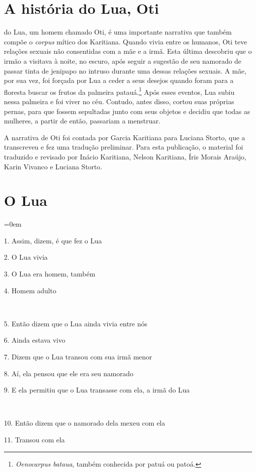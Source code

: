 \chapter{A história do Lua, Oti}

 do Lua, um homem chamado Oti, é uma importante narrativa que
também compõe o \emph{corpus} mítico dos Karitiana. Quando vivia entre
os humanos, Oti teve relações sexuais não consentidas com a mãe e a
irmã. Esta última descobriu que o irmão a visitava à noite, no escuro,
após seguir a sugestão de seu namorado de passar tinta de jenipapo no
intruso durante uma dessas relações sexuais. A mãe, por sua vez, foi
forçada por Lua a ceder a seus desejos quando foram para a floresta
buscar os frutos da palmeira patauá.\footnote{\emph{Oenocarpus bataua},
  também conhecida por patuá ou patoá.} Após esses eventos, Lua subiu
nessa palmeira e foi viver no céu. Contudo, antes disso, cortou suas
próprias pernas, para que fossem sepultadas junto com seus objetos e
decidiu que todas as mulheres, a partir de então, passariam a menstruar.

A narrativa de Oti foi contada por Garcia Karitiana para Luciana Storto,
que a transcreveu e fez uma tradução preliminar. Para esta publicação, o
material foi traduzido e revisado por Inácio Karitiana, Nelson
Karitiana, Íris Morais Araújo, Karin Vivanco e Luciana Storto.


\chapter*{O Lua}
\begingroup\parindent=0em

1. Assim, dizem, é que fez o Lua

2. O Lua vivia

3. O Lua era homem, também

4. Homem adulto

~

5. Então dizem que o Lua ainda vivia entre nós

6. Ainda estava vivo

7. Dizem que o Lua transou com sua irmã menor

8. Aí, ela pensou que ele era seu namorado

9. E ela permitiu que o Lua transasse com ela, a irmã do Lua

~

10. Então dizem que o namorado dela mexeu com ela

11. Transou com ela

